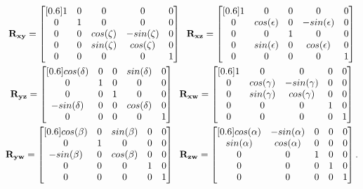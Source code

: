 \documentclass[12pt, letterpaper]{article}
\begin{document}
\begin{gather}
    \mathbf{R_{xy}} = \begin{bmatrix}[0.6] 1 & 0 & 0 & 0 & 0 \\ 0 & 1 & 0 & 0 & 0\\ 0 & 0 & cos(\zeta) & -sin(\zeta) & 0\\ 0 & 0 & sin(\zeta) & cos(\zeta) & 0\\ 0 & 0 & 0 & 0 & 1\end{bmatrix}\;\;
    \mathbf{R_{xz}} = \begin{bmatrix}[0.6] 1 & 0 & 0 & 0 & 0 \\ 0 & cos(\epsilon) & 0 & -sin(\epsilon) & 0\\ 0 & 0 & 1 & 0 & 0\\ 0 & sin(\epsilon) & 0 & cos(\epsilon) & 0\\ 0 & 0 & 0 & 0 & 1\end{bmatrix}\notag\\ 
    \mathbf{R_{yz}} = \begin{bmatrix}[0.6] cos(\delta) & 0 & 0 & sin(\delta) & 0 \\ 0 & 1 & 0 & 0 & 0\\ 0 & 0 & 1 & 0 & 0\\ -sin(\delta) & 0 & 0 & cos(\delta) & 0\\ 0 & 0 & 0 & 0 & 1\end{bmatrix}\;\;
    \mathbf{R_{xw}} = \begin{bmatrix}[0.6] 1 & 0 & 0 & 0 & 0 \\ 0 & cos(\gamma) & -sin(\gamma) & 0 & 0\\ 0 & sin(\gamma) & cos(\gamma) & 0 & 0\\ 0 & 0 & 0 & 1 & 0\\ 0 & 0 & 0 & 0 & 1\end{bmatrix}\\
    \mathbf{R_{yw}} = \begin{bmatrix}[0.6] cos(\beta) & 0 & sin(\beta) & 0 & 0 \\ 0 & 1 & 0 & 0 & 0\\ -sin(\beta) & 0 & cos(\beta) & 0 & 0\\ 0 & 0 & 0 & 1 & 0\\ 0 & 0 & 0 & 0 & 1\end{bmatrix}\;\;
    \mathbf{R_{zw}} = \begin{bmatrix}[0.6] cos(\alpha) & -sin(\alpha) & 0 & 0 & 0 \\ sin(\alpha) & cos(\alpha) & 0 & 0 & 0\\ 0 & 0 & 1 & 0 & 0\\ 0 & 0 & 0 & 1 & 0\\ 0 & 0 & 0 & 0 & 1\end{bmatrix}.\notag
\end{gather}
\end{document}
